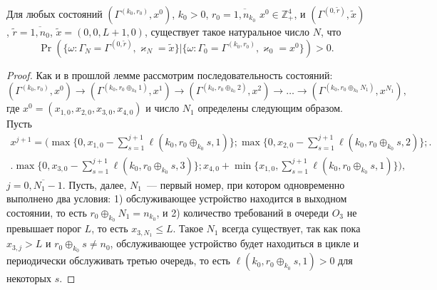 \documentclass[a4paper,12pt,russian]{extarticle}
\begin{document}
\begin{lemma}\label{class:2}
Для любых состояний $(\Gamma^{(k_0,r_0)},x^0)$, $k_0 > 0$, $r_0=\overline{1,n_{k_0}}$ $x^0 \in \mathbb{Z}_+^4$, и $(\Gamma^{(0,\tilde{r})},\tilde{x})$, $\tilde{r} = \overline{1,n_0}$, $\tilde{x}=(0,0,L+1,0)$, существует такое натуральное число $N$, что 
\begin{equation*}
\Pr(\{\omega\colon \Gamma_{N}=\Gamma^{(0,\tilde{r} )}, \varkappa_{N}=\tilde{x}\}|\{\omega\colon 
\Gamma_{0}=\Gamma^{(k_0,r_0)}, \varkappa_{0}=x^0\})>0.
\end{equation*}
\end{lemma}
\begin{proof}
Как и в прошлой лемме рассмотрим последовательность состояний: 
\begin{equation*}
(\Gamma^{(k_0,r_0)},x^0) \rightarrow (\Gamma^{(k_0,r_0\oplus_{k_0}1)},x^1) \rightarrow (\Gamma^{(k_0,r_0\oplus_{k_0}2)},x^2) \rightarrow \ldots \rightarrow (\Gamma^{(k_0,r_0\oplus_{k_0}N_1)},x^{N_1}),
\end{equation*}
где $x^0=(x_{1,0}, x_{2,0}, x_{3,0}, x_{4,0})$ и число $N_1$ определены следующим образом. Пусть 
\begin{multline*}
x^{j+1}=\biggl(\max{\biggl\{0,x_{1,0} - \sum_{s=1}^{j+1}\ell(k_0,r_0\oplus_{k_0}s,1)\biggr\}};
\max{\biggl\{0,x_{2,0} - \sum_{s=1}^{j+1}\ell(k_0,r_0\oplus_{k_0}s,2)\biggr\}};\biggr.\\
\biggl.\max{\biggl\{0,x_{3,0} - \sum_{s=1}^{j+1}\ell(k_0,r_0\oplus_{k_0}s,3)\biggr\}};
x_{4,0} + \min{\biggl\{x_{1,0}, \sum_{s=1}^{j+1}\ell(k_0,r_0\oplus_{k_0}s,1)\biggr\}}\biggr),
\end{multline*}
$j=\overline{0,N_1-1}$. Пусть, далее, $N_1$~--- первый номер, при котором одновременно выполнено два условия: 1) обслуживающее устройство находится в выходном состоянии, то есть $r_0\oplus_{k_0}N_1 = n_{k_0}$, и 2) количество требований в очереди $O_3$ не превышает порог $L$, то есть  $x_{3,N_1}\leqslant L$. Такое $N_1$ всегда существует, так как пока $x_{3,j}>L$ и $r_0\oplus_{k_0}s \neq n_0$, обслуживающее устройство будет находиться в цикле и периодически обслуживать третью очередь, то есть $\ell(k_0,r_0\oplus_{k_0}s,1)>0$  для некоторых $s$.


\end{proof}
\end{document}
